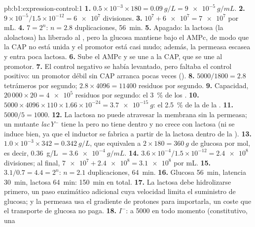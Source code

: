 \begin{solution}{pb:b1:expression-control:1}
\textbf{1.} $0.5\times 10^{-3}\times 180 = \qty{0.09}{g/L} =
\qty{9e-5}{g/mL}$.
\textbf{2.} $9\times 10^{-5}/1.5\times 10^{-12} = \num{6e7}$ divisiones.
\textbf{3.} $10^7 + \num{6e7} = \num{7e7}$  por mL.
\textbf{4.} $7 = 2^n$: $n = 2.8$ duplicaciones, \qty{56}{min}.
\textbf{5.} Apagado: la lactosa (la alolactosa) ha liberado al ,
pero la glucosa mantiene bajo el AMPc, de modo que la CAP no está unida y el
promotor está casi mudo; además, la permeasa escasea y entra poca lactosa.
\textbf{6.} Sube el AMPc y se une a la CAP, que se une al promotor.
\textbf{7.} El control negativo se había levantado, pero faltaba el control
positivo: un promotor débil sin CAP arranca pocas veces ().
\textbf{8.} $5000/1800 = 2.8$ tetrámeros por segundo; $2.8\times 4096 =
\num{11400}$ residuos por segundo.
\textbf{9.} Capacidad, $20\,000\times 20 = \num{4e5}$ residuos por segundo:
el \qty{3}{\%} de los .
\textbf{10.} $5000\times 4096\times 110\times 1.66\times 10^{-24} =
\qty{3.7e-15}{g}$: el \qty{2.5}{\%} de la  de la .
\textbf{11.} $5000/5 = 1000$.
\textbf{12.} La lactosa no puede atravesar la membrana sin la permeasa; un
mutante \emph{lacY}$^-$ tiene la  pero no tiene  dentro y no
crece con lactosa (ni se induce bien, ya que el inductor se fabrica a partir
de la lactosa dentro de la ).
\textbf{13.} $1.0\times 10^{-3}\times 342 = \qty{0.342}{g/L}$, que equivalen
a $2\times 180 = \qty{360}{g}$ de glucosa por mol, es decir, \qty{0.36}{g/L}
$= \qty{3.6e-4}{g/mL}$.
\textbf{14.} $3.6\times 10^{-4}/1.5\times 10^{-12} = \num{2.4e8}$
divisiones; al final, $\num{7e7} + \num{2.4e8} = \num{3.1e8}$ por mL.
\textbf{15.} $3.1/0.7 = 4.4 = 2^n$: $n = 2.1$ duplicaciones, \qty{64}{min}.
\textbf{16.} Glucosa \qty{56}{min}, latencia \qty{30}{min}, lactosa
\qty{64}{min}: \qty{150}{min} en total.
\textbf{17.} La lactosa debe hidrolizarse primero, un paso enzimático
adicional cuya velocidad limita el suministro de glucosa; y la permeasa usa
el gradiente de protones para importarla, un coste que el transporte de
glucosa no paga.
\textbf{18.} $I^-$:  a \num{5000} en todo momento (constitutivo, una

\end{solution}
